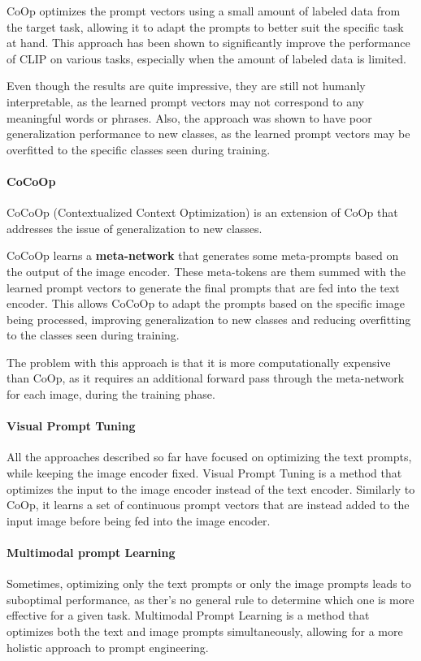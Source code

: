 CoOp optimizes the prompt vectors using a small amount of labeled data from the target task, allowing it to adapt the prompts to better suit the specific task at hand.
This approach has been shown to significantly improve the performance of CLIP on various tasks, especially when the amount of labeled data is limited.

Even though the results are quite impressive, they are still not humanly interpretable, as the learned prompt vectors may not correspond to any meaningful words or phrases.
Also, the approach was shown to have poor generalization performance to new classes, as the learned prompt vectors may be overfitted to the specific classes seen during training.

\paragraph{CoCoOp}
CoCoOp (Contextualized Context Optimization) is an extension of CoOp that addresses the issue of generalization to new classes. 

CoCoOp learns a \textbf{meta-network} that generates some meta-prompts based on the output of the image encoder. These meta-tokens
are them summed with the learned prompt vectors to generate the final prompts that are fed into the text encoder.
This allows CoCoOp to adapt the prompts based on the specific image being processed, improving generalization to new classes and reducing overfitting to the classes seen during training.

The problem with this approach is that it is more computationally expensive than CoOp, as it requires an additional forward pass through the meta-network for each image,
during the training phase.

\paragraph{Visual Prompt Tuning}
All the approaches described so far have focused on optimizing the text prompts, while keeping the image encoder fixed.
Visual Prompt Tuning is a method that optimizes the input to the image encoder instead of the text encoder. 
Similarly to CoOp, it learns a set of continuous prompt vectors that are instead added to the input image before being fed into the image encoder.

\paragraph{Multimodal prompt Learning}
Sometimes, optimizing only the text prompts or only the image prompts leads to suboptimal performance, as ther's no general rule to determine which one is more effective for a given task.
Multimodal Prompt Learning is a method that optimizes both the text and image prompts simultaneously, allowing for a more holistic approach to prompt engineering.

